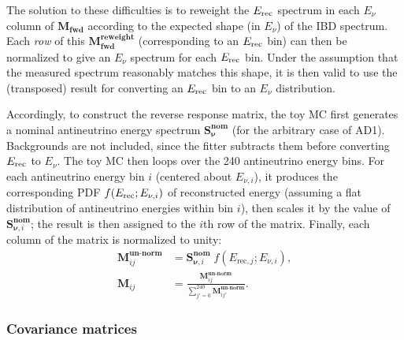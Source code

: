 \documentclass[../thesis.tex]{subfiles}
\begin{document}
The solution to these difficulties is to reweight the $E_\mathrm{rec}$ spectrum in each $E_\nu$ column of $\mathbf{M_{fwd}}$ according to the expected shape (in $E_\nu$) of the IBD spectrum.
Each \emph{row} of this $\mathbf{M_{fwd}^{reweight}}$ (corresponding to an $E_\mathrm{rec}$ bin) can then be normalized to give an $E_\nu$ spectrum for each $E_\mathrm{rec}$ bin. Under the assumption that the measured spectrum reasonably matches this shape, it is then valid to use the (transposed) result for converting an $E_\mathrm{rec}$ bin to an $E_\nu$ distribution.

\begin{comment}
\footnote{Given that the shape is distorted both by oscillations and by differences in the fission fractions, it is important to verify that the analysis is insensitive to such variations in the spectral shape. XXX, was this done?}
\end{comment}

\begin{comment}
  We should fix genEvisToEnuMatrix.C to turn off the theta13 oscillation, and then note below that oscillations are disabled.
\end{comment}

Accordingly, to construct the reverse response matrix, the toy MC first generates a nominal antineutrino energy spectrum $\mathbf{S^{nom}_\nu}$ (for the arbitrary case of AD1). Backgrounds are not included, since the fitter subtracts them before converting $E_\mathrm{rec}$ to $E_\nu$. The toy MC then loops over the 240 antineutrino energy bins. For each antineutrino energy bin $i$ (centered about $E_{\nu,i}$), it produces the corresponding PDF $f(E_\mathrm{rec}; E_{\nu,i})$ of reconstructed energy (assuming a flat distribution of antineutrino energies within bin $i$), then scales it by the value of $\mathbf{S}^{\mathbf{nom}}_{\mathbf{\nu},i}$; the result is then assigned to the $i$th row of the matrix. Finally, each column of the matrix is normalized to unity:
\begin{align}
  \label{eq:revRespMtxUnNorm}
  \mathbf{M}^{\textbf{un-norm}}_{ij} &= \mathbf{S}^{\mathbf{nom}}_{\mathbf{\nu},i} \; f(E_{\mathrm{rec},j}; E_{\nu,i}), \\
  \label{eq:revRespMtx}
  \mathbf{M}_{ij} &= \frac{\mathbf{M}^{\textbf{un-norm}}_{ij}}{\sum_{j'=0}^{240} \mathbf{M}^{\textbf{un-norm}}_{ij'}}.
\end{align}

\subsubsection{Covariance matrices}
\label{sec:fitToyCovMatDetails}
\end{document}
